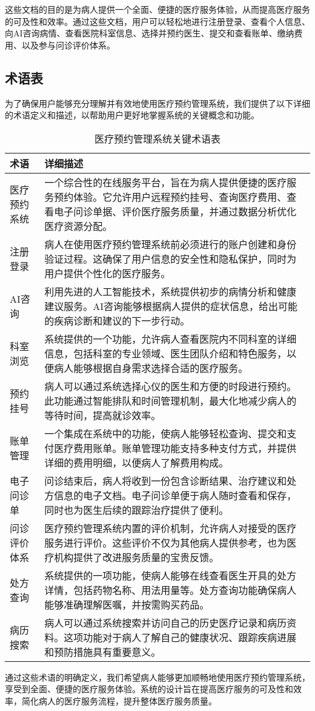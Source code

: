 这些文档的目的是为病人提供一个全面、便捷的医疗服务体验，从而提高医疗服务的可及性和效率。通过这些文档，用户可以轻松地进行注册登录、查看个人信息、向AI咨询病情、查看医院科室信息、选择并预约医生、提交和查看账单、缴纳费用、以及参与问诊评价体系。

\subsection{术语表}

为了确保用户能够充分理解并有效地使用医疗预约管理系统，我们提供了以下详细的术语定义和描述，以帮助用户更好地掌握系统的关键概念和功能。

\begin{table}[htbp]
	\centering
	\begin{tabular}{|l|p{10cm}|}
		\hline
		\textbf{术语} & \textbf{详细描述} \\ \hline
		医疗预约系统 & 一个综合性的在线服务平台，旨在为病人提供便捷的医疗服务预约体验。它允许用户远程预约挂号、查询医疗费用、查看电子问诊单据、评价医疗服务质量，并通过数据分析优化医疗资源分配。 \\ \hline
		注册登录 & 病人在使用医疗预约管理系统前必须进行的账户创建和身份验证过程。这确保了用户信息的安全性和隐私保护，同时为用户提供个性化的医疗服务。 \\ \hline
		AI咨询 & 利用先进的人工智能技术，系统提供初步的病情分析和健康建议服务。AI咨询能够根据病人提供的症状信息，给出可能的疾病诊断和建议的下一步行动。 \\ \hline
		科室浏览 & 系统提供的一个功能，允许病人查看医院内不同科室的详细信息，包括科室的专业领域、医生团队介绍和特色服务，以便病人能够根据自身需求选择合适的医疗服务。 \\ \hline
		预约挂号 & 病人可以通过系统选择心仪的医生和方便的时段进行预约。此功能通过智能排队和时间管理机制，最大化地减少病人的等待时间，提高就诊效率。 \\ \hline
		账单管理 & 一个集成在系统中的功能，使病人能够轻松查询、提交和支付医疗费用账单。账单管理功能支持多种支付方式，并提供详细的费用明细，以便病人了解费用构成。 \\ \hline
		电子问诊单 & 问诊结束后，病人将收到一份包含诊断结果、治疗建议和处方信息的电子文档。电子问诊单便于病人随时查看和保存，同时也为医生后续的跟踪治疗提供了便利。 \\ \hline
		问诊评价体系 & 医疗预约管理系统内置的评价机制，允许病人对接受的医疗服务进行评价。这些评价不仅为其他病人提供参考，也为医疗机构提供了改进服务质量的宝贵反馈。 \\ \hline
		处方查询 & 系统提供的一项功能，使病人能够在线查看医生开具的处方详情，包括药物名称、用法用量等。处方查询功能确保病人能够准确理解医嘱，并按需购买药品。 \\ \hline
		病历搜索 & 病人可以通过系统搜索并访问自己的历史医疗记录和病历资料。这项功能对于病人了解自己的健康状况、跟踪疾病进展和预防措施具有重要意义。 \\ \hline
	\end{tabular}
	\caption{医疗预约管理系统关键术语表}
\end{table}

通过这些术语的明确定义，我们希望病人能够更加顺畅地使用医疗预约管理系统，享受到全面、便捷的医疗服务体验。系统的设计旨在提高医疗服务的可及性和效率，简化病人的医疗服务流程，提升整体医疗服务质量。

\newpage
